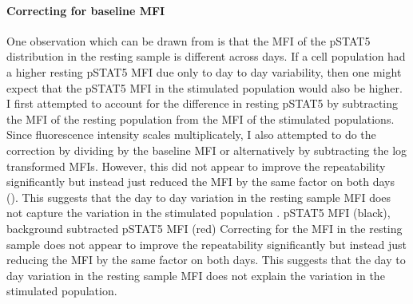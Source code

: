 \paragraph{ Correcting for baseline MFI }
One observation which can be drawn from  is that the
MFI of the pSTAT5 distribution in the resting sample is different across days.
If a cell population had a higher resting pSTAT5 MFI due only to day to day variability,
then one might expect that the pSTAT5 MFI in the stimulated population would also be higher.
I first attempted to account for the difference in resting pSTAT5 by subtracting the MFI of the resting population from the MFI of
the stimulated populations.
Since fluorescence intensity scales multiplicately, I also attempted to do the correction by dividing by the baseline MFI
or alternatively by subtracting the log transformed MFIs.
However, this did not appear to improve the repeatability significantly but instead just reduced the MFI by the same factor on both days
().
This suggests that the day to day variation in the resting sample MFI does not capture the variation in the stimulated population
.
{ pSTAT5 MFI (black), background subtracted pSTAT5 MFI (red) }
{
  Correcting for the MFI in the resting sample does not appear to improve the repeatability significantly but instead just reducing the MFI by
  the same factor on both days.
  This suggests that the day to day variation in the resting sample MFI does not explain the variation in the stimulated population.
}

\clearpage

